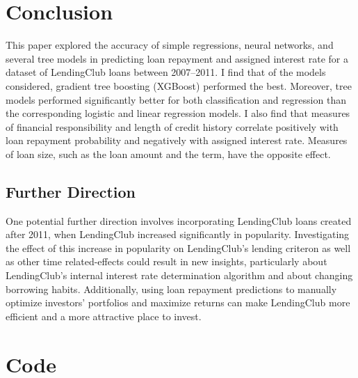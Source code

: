 \documentclass[12pt]{article}
\begin{document}
\section{Conclusion}

This paper explored the accuracy of simple regressions, neural networks, and several tree models in predicting loan repayment and assigned interest rate for a dataset of LendingClub loans between 2007--2011. I find that of the models considered, gradient tree boosting (XGBoost) performed the best. Moreover, tree models performed significantly better for both classification and regression than the corresponding logistic and linear regression models. I also find that measures of financial responsibility and length of credit history correlate positively with loan repayment probability and negatively with assigned interest rate. Measures of loan size, such as the loan amount and the term, have the opposite effect. 

\subsection{Further Direction}

One potential further direction involves incorporating LendingClub loans created after 2011, when LendingClub increased significantly in popularity. Investigating the effect of this increase in popularity on LendingClub's lending criteron as well as other time related-effects could result in new insights, particularly about LendingClub's internal interest rate determination algorithm and about changing borrowing habits. Additionally, using loan repayment predictions to manually optimize investors' portfolios and maximize returns can make LendingClub more efficient and a more attractive place to invest. 

\newpage
{}







\newpage
\appendix

\section{Code}
\label{appendix:code}

\singlespacing
\footnotesize
{}
\end{document}
